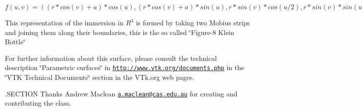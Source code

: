 \begin{DoxyItemize}
\item $f(u,v) = ((r*cos(v)+a)*cos(u),(r*cos(v)+a)*sin(u),r*sin(v)*cos(u/2),r*sin(v)*sin(u/2))$
\end{DoxyItemize}

This representation of the immersion in $R^3$ is formed by taking two Mobius strips and joining them along their boundaries, this is the so called \char`\"{}\-Figure-\/8 Klein Bottle\char`\"{}

For further information about this surface, please consult the technical description \char`\"{}\-Parametric surfaces\char`\"{} in \href{http://www.vtk.org/documents.php}{\tt http\-://www.\-vtk.\-org/documents.\-php} in the \char`\"{}\-V\-T\-K Technical Documents\char`\"{} section in the V\-Tk.\-org web pages.

.S\-E\-C\-T\-I\-O\-N Thanks Andrew Maclean \href{mailto:a.maclean@cas.edu.au}{\tt a.\-maclean@cas.\-edu.\-au} for creating and contributing the class.


